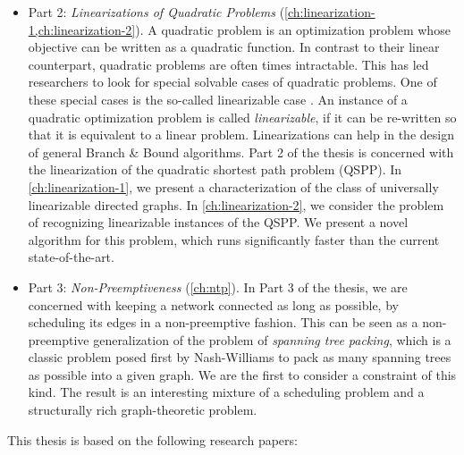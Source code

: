 \begin{itemize}
\item Part 2: \emph{Linearizations of Quadratic Problems}  (\cref{ch:linearization-1,ch:linearization-2}). 
A quadratic problem is an optimization problem whose objective can be written as a quadratic function. 
In contrast to their linear counterpart, quadratic problems are often times intractable. 
This has led researchers to look for special solvable cases of quadratic problems. One of these special cases is the so-called linearizable case \cite{bookhold1990contribution}. 
An instance of a quadratic optimization problem is called \emph{linearizable}, if it can be re-written so that it is equivalent to a linear problem. Linearizations can help in the design of general Branch \& Bound algorithms. Part 2 of the thesis is concerned with the linearization of the quadratic shortest path problem (QSPP). In \cref{ch:linearization-1}, we present a characterization of the class of universally linearizable directed graphs. In \cref{ch:linearization-2}, we consider the problem of recognizing linearizable instances of the QSPP. We present a novel algorithm for this problem, which runs significantly faster than the current state-of-the-art.

\item Part 3: \emph{Non-Preemptiveness} (\cref{ch:ntp}). In Part 3 of the thesis, we are concerned with keeping a network connected as long as possible, by scheduling its edges in a non-preemptive fashion.
This can be seen as a non-preemptive generalization of the problem of \emph{spanning tree packing}, which is a classic problem posed first by Nash-Williams \cite{Nash-Williams1961} to pack as many spanning trees as possible into a given graph. We are the first to consider a constraint of this kind. The result is an interesting mixture of a scheduling problem and a structurally rich graph-theoretic problem.
\end{itemize}

This thesis is based on the following research papers:

